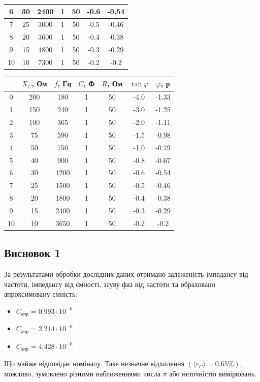 \documentclass[a4paper,12pt]{article}
\begin{document}
\begin{justify}
\begin{table}[htp]
\begin{tabular}{|c|c|c|c|c|c|c|}
6  & 30    & 2400 & 1   & 50  & -0.6          & -0.54     \\ \hline
7  & 25    & 3000 & 1   & 50  & -0.5          & -0.46     \\ \hline
8  & 20    & 3600 & 1   & 50  & -0.4          & -0.38     \\ \hline
9  & 15    & 4800 & 1   & 50  & -0.3          & -0.29     \\ \hline
10 & 10    & 7300 & 1   & 50  & -0.2          & -0.2      \\ \hline
\end{tabular}
\end{table}
\begin{table}[htp]
\centering
\begin{tabular}{|c|c|c|c|c|c|c|}
\hline
   & $X_C$, Ом& $f$, Гц & $C$, Ф& $R$, Ом& $\tan\varphi$ & $\varphi$, р\\ \hline
0  & 200   & 180   & 1   & 50  & -4.0          & -1.33     \\ \hline
1  & 150   & 240   & 1   & 50  & -3.0          & -1.25     \\ \hline
2  & 100   & 365   & 1   & 50  & -2.0          & -1.11     \\ \hline
3  & 75    & 590   & 1   & 50  & -1.5          & -0.98     \\ \hline
4  & 50    & 750   & 1   & 50  & -1.0          & -0.79     \\ \hline
5  & 40    & 900   & 1   & 50  & -0.8          & -0.67     \\ \hline
6  & 30    & 1200  & 1   & 50  & -0.6          & -0.54     \\ \hline
7  & 25    & 1500  & 1   & 50  & -0.5          & -0.46     \\ \hline
8  & 20    & 1800  & 1   & 50  & -0.4          & -0.38     \\ \hline
9  & 15    & 2400  & 1   & 50  & -0.3          & -0.29     \\ \hline
10 & 10    & 3650  & 1   & 50  & -0.2          & -0.2      \\ \hline
\end{tabular}
\end{table}\newpage
\subsection*{Висновок 1}
За результатами обробки дослідних даних отримано залеженість імпедансу від частоти, імпедансу від ємності, зсуву фаз від частоти та обраховано апроксимовану ємність:
\begin{itemize}
		\item $C_{\textrm{апр}}=0.993\cdot10^{-6}$
		\item $C_{\textrm{апр}}=2.214\cdot10^{-6}$
		\item $C_{\textrm{апр}}=4.428\cdot10^{-6}$
	\end{itemize}
Що майже відповідає номіналу. Таке незначне відхилення $(\langle\varepsilon_C\rangle=0.65\%)$, можливо, зумовлено різними наближеннями числа $\pi$ або неточністю вимірювань.\newpage

\end{justify}
\end{document}
